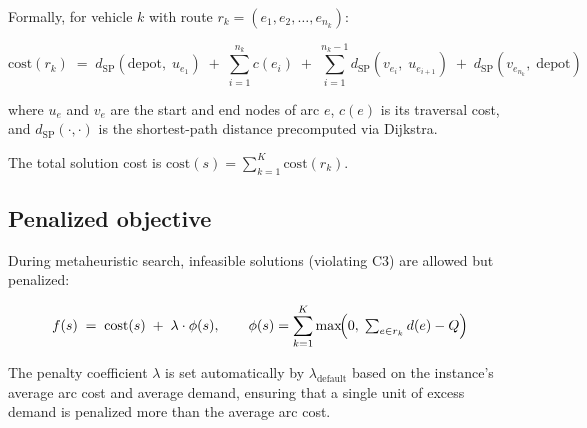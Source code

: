 \documentclass[12pt, a4paper]{article}
\begin{document}
Formally, for vehicle $k$ with route
$r_k = (e_1, e_2, \ldots, e_{n_k})$:

\[
    \text{cost}(r_k) \;=\;
    d_{\text{SP}}(\text{depot},\; u_{e_1})
    \;+\; \sum_{i=1}^{n_k} c(e_i)
    \;+\; \sum_{i=1}^{n_k - 1} d_{\text{SP}}(v_{e_i},\; u_{e_{i+1}})
    \;+\; d_{\text{SP}}(v_{e_{n_k}},\; \text{depot})
\]

where $u_e$ and $v_e$ are the start and end nodes of arc $e$,
$c(e)$ is its traversal cost, and $d_{\text{SP}}(\cdot,\cdot)$ is the
shortest-path distance precomputed via Dijkstra.

The total solution cost is $\text{cost}(s) = \sum_{k=1}^{K} \text{cost}(r_k)$.

\subsection{Penalized objective}

During metaheuristic search, infeasible solutions (violating C3) are
allowed but penalized:

\[
    f(s) \;=\; \text{cost}(s) \;+\; \lambda \cdot \phi(s),
    \qquad
    \phi(s) = \sum_{k=1}^{K} \max\!\Bigl(0,\; \textstyle\sum_{e \in r_k} d(e) - Q\Bigr)
\]

The penalty coefficient $\lambda$ is set automatically by
$\lambda_{\text{default}}$ based on the instance's average arc cost
and average demand, ensuring that a single unit of excess demand is
penalized more than the average arc cost.
\end{document}
